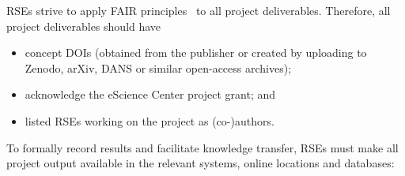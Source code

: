 RSEs strive to apply FAIR principles~\cite{fair-principles,FAIR4RS} to all project deliverables. Therefore, all project deliverables should have

\begin{itemize}
\item concept DOIs (obtained from the publisher or created by uploading to Zenodo, arXiv, DANS or similar open-access
archives);
\item acknowledge the eScience Center project grant; and
\item listed RSEs working on the project as (co-)authors.
\end{itemize}

To formally record results and facilitate knowledge transfer, RSEs must make all project output available in the
relevant systems, online locations and databases:

